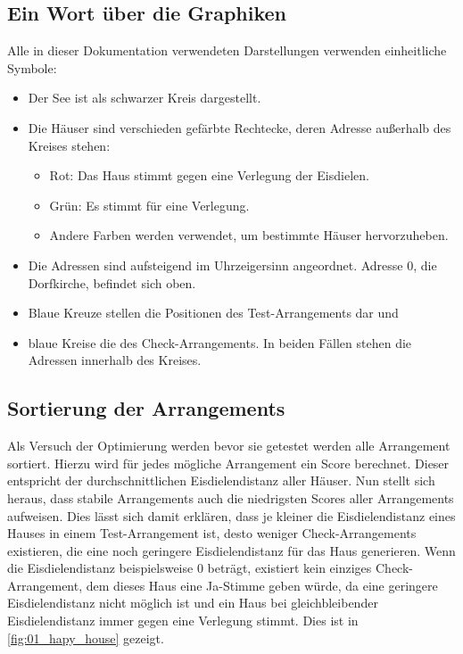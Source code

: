 \documentclass[a4paper,10pt,ngerman,captions=figureheading]{scrartcl}
\begin{document}
\subsection{Ein Wort über die Graphiken}
Alle in dieser Dokumentation verwendeten Darstellungen verwenden einheitliche Symbole:
\begin{itemize}
    \item Der See ist als schwarzer Kreis dargestellt.
    \item Die Häuser sind verschieden gefärbte Rechtecke, deren Adresse außerhalb des Kreises stehen:
          \begin{itemize}
              \item Rot: Das Haus stimmt gegen eine Verlegung der Eisdielen.
              \item Grün: Es stimmt für eine Verlegung.
              \item Andere Farben werden verwendet, um bestimmte Häuser hervorzuheben.
          \end{itemize}
    \item Die Adressen sind aufsteigend im Uhrzeigersinn angeordnet.
          Adresse $0$, die Dorfkirche, befindet sich oben.
    \item Blaue Kreuze stellen die Positionen des Test-Arrangements dar und
    \item blaue Kreise die des Check-Arrangements.
          In beiden Fällen stehen die Adressen innerhalb des Kreises.
\end{itemize}

\subsection{Sortierung der Arrangements}
\label{sec:Sortierung_der_Arrangements}
Als Versuch der Optimierung werden bevor sie getestet werden alle Arrangement sortiert.
Hierzu wird für jedes mögliche Arrangement ein Score berechnet.
Dieser entspricht der durchschnittlichen Eisdielendistanz aller Häuser.
Nun stellt sich heraus, dass stabile Arrangements auch die niedrigsten Scores aller Arrangements aufweisen.
Dies lässt sich damit erklären, dass je kleiner die Eisdielendistanz eines Hauses in einem Test-Arrangement ist, desto weniger Check-Arrangements existieren, die eine noch geringere Eisdielendistanz für das Haus generieren.
Wenn die Eisdielendistanz beispielsweise $0$ beträgt, existiert kein einziges Check-Arrangement, dem dieses Haus eine Ja-Stimme geben würde, da eine geringere Eisdielendistanz nicht möglich ist und ein Haus bei gleichbleibender Eisdielendistanz immer gegen eine Verlegung stimmt.
Dies ist in \autoref{fig:01_hapy_house} gezeigt.
\end{document}
